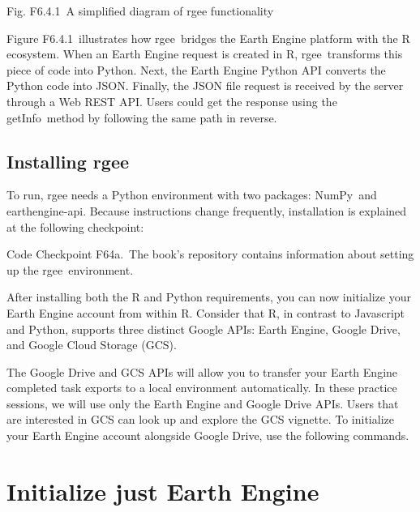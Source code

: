 \documentclass[
  letterpaper,
  DIV=11,
  numbers=noendperiod]{scrreprt}
\begin{document}
Fig. F6.4.1~A simplified diagram of rgee functionality

Figure F6.4.1~illustrates how rgee~bridges the Earth Engine platform
with the R ecosystem. When an Earth Engine request is created in R,
rgee~transforms this piece of code into Python. Next, the Earth Engine
Python API converts the Python code into JSON. Finally, the JSON file
request is received by the server through a Web REST API. Users could
get the response using the getInfo~method by following the same path in
reverse.

\hypertarget{installing-rgee}{%
\section{Installing rgee~}\label{installing-rgee}}

To run, rgee needs a Python environment with two packages: NumPy~and
earthengine-api. Because instructions change frequently, installation is
explained at the following checkpoint:

\begin{tcolorbox}[enhanced jigsaw, left=2mm, breakable, rightrule=.15mm, opacityback=0, colframe=quarto-callout-note-color-frame, colbacktitle=quarto-callout-note-color!10!white, arc=.35mm, opacitybacktitle=0.6, toptitle=1mm, colback=white, leftrule=.75mm, title=\textcolor{quarto-callout-note-color}{\faInfo}\hspace{0.5em}{Note}, toprule=.15mm, bottomtitle=1mm, titlerule=0mm, bottomrule=.15mm, coltitle=black]

Code Checkpoint F64a.~The book's repository contains information about
setting up the rgee~environment.

\end{tcolorbox}

After installing both the R and Python requirements, you can now
initialize your Earth Engine account from within R. Consider that R, in
contrast to Javascript and Python, supports three distinct Google APIs:
Earth Engine, Google Drive, and Google Cloud Storage (GCS).

The Google Drive and GCS APIs will allow you to transfer your Earth
Engine completed task exports to a local environment automatically. In
these practice sessions, we will use only the Earth Engine and Google
Drive APIs. Users that are interested in GCS can look up and explore the
GCS vignette. To initialize your Earth Engine account alongside Google
Drive, use the following commands.

\hypertarget{initialize-just-earth-engine}{%
\chapter{Initialize just Earth
Engine}\label{initialize-just-earth-engine}}
\end{document}

